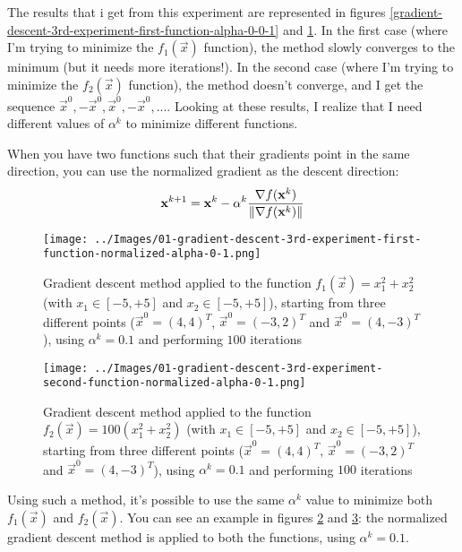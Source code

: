 \begin{enumerate}
\begin{figure}
                \label{gradient-descent-3rd-experiment-second-function-alpha-0-0-1}
            \end{figure}
            The results that i get from this experiment are represented in figures \ref{gradient-descent-3rd-experiment-first-function-alpha-0-0-1} and \ref{gradient-descent-3rd-experiment-second-function-alpha-0-0-1}. In the first case (where I'm trying to minimize the \(f_1(\vec{x})\) function), the method slowly converges to the minimum (but it needs more iterations!). In the second case (where I'm trying to minimize the \(f_2(\vec{x})\) function), the method doesn't converge, and I get the sequence \(\vec{x}^0, -\vec{x}^0, \vec{x}^0, -\vec{x}^0, ...\). Looking at these results, I realize that I need different values of \(\alpha^k\) to minimize different functions.\par
            When you have two functions such that their gradients point in the same direction, you can use the normalized gradient as the descent direction:
            \[\mathbf{x}^{k+1} = \mathbf{x}^k - \alpha^k \frac{\nabla f(\mathbf{x}^k)}{\left\lVert\nabla f(\mathbf{x}^k)\right\rVert}\]
            \begin{figure}
                \centering
                \texttt{[image: ../Images/01-gradient-descent-3rd-experiment-first-function-normalized-alpha-0-1.png]}
                \caption{Gradient descent method applied to the function \(f_1(\vec{x}) = x_{1}^{2} + x_{2}^{2}\) (with \(x_1 \in [-5, +5]\) and \(x_2 \in [-5, +5]\)), starting from three different points (\(\vec{x}^0 = (4,4)^T\), \(\vec{x}^0 = (-3,2)^T\) and \(\vec{x}^0 = (4,-3)^T\)), using \(\alpha^k = 0.1\) and performing \(100\) iterations}
                \label{gradient-descent-3rd-experiment-first-function-normalized-alpha-0-1}
            \end{figure}
            \begin{figure}
                \centering
                \texttt{[image: ../Images/01-gradient-descent-3rd-experiment-second-function-normalized-alpha-0-1.png]}
                \caption{Gradient descent method applied to the function \(f_2(\vec{x}) = 100(x_{1}^{2} + x_{2}^{2})\) (with \(x_1 \in [-5, +5]\) and \(x_2 \in [-5, +5]\)), starting from three different points (\(\vec{x}^0 = (4,4)^T\), \(\vec{x}^0 = (-3,2)^T\) and \(\vec{x}^0 = (4,-3)^T\)), using \(\alpha^k = 0.1\) and performing \(100\) iterations}
                \label{gradient-descent-3rd-experiment-second-function-normalized-alpha-0-1}
            \end{figure}
            Using such a method, it's possible to use the same \(\alpha^k\) value to minimize both \(f_1(\vec{x})\) and \(f_2(\vec{x})\). You can see an example in figures \ref{gradient-descent-3rd-experiment-first-function-normalized-alpha-0-1} and \ref{gradient-descent-3rd-experiment-second-function-normalized-alpha-0-1}: the normalized gradient descent method is applied to both the functions, using \(\alpha^k = 0.1\).
        \end{enumerate}
